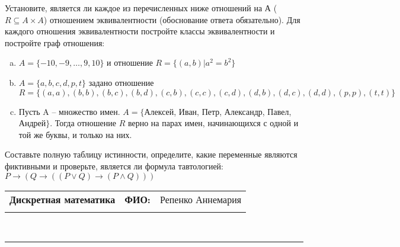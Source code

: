 \documentclass[10pt]{exam}
\newcommand{\class}{Дискретная математика}
\newcommand{\examdate}{}
\begin{document}
\begin{questions}
\question
Установите, является ли каждое из перечисленных ниже отношений на А ($R \subseteq A \times A$) отношением эквивалентности (обоснование ответа обязательно). Для каждого отношения эквивалентности постройте классы 
эквивалентности и постройте граф отношения:
\begin{enumerate} [a)]\setcounter{enumi}{0}
\item $A = \{-10, -9, … , 9, 10\}$ и отношение $R = \{(a,b)|a^{2} = b^{2}\}$
\item $A = \{a, b, c, d, p, t\}$ задано отношение $R = \{(a, a), (b, b), (b, c), (b, d), (c, b), (c, c), (c, d), (d, b), (d, c), (d, d), (p,p), (t,t)\}$
\item Пусть A – множество имен. $A = \{ $Алексей, Иван, Петр, Александр, Павел, Андрей$ \}$. Тогда отношение $R$ верно на парах имен, начинающихся с одной и той же буквы, и только на них.
\end{enumerate}\question Составьте полную таблицу истинности, определите, какие переменные являются фиктивными и проверьте, является ли формула тавтологией:
$ P \rightarrow (Q \rightarrow ((P \lor Q) \rightarrow (P \land Q)))$

\end{questions}
\newpage
\begin{flushright}
\begin{tabular}{p{2.8in} r l}
\textbf{\class} & \textbf{ФИО:} &Репенко Аннемария
\\

\textbf{\examdate} &&\\
\end{tabular}\\
\end{flushright}
\rule[1ex]{\textwidth}{.1pt}
\end{document}
